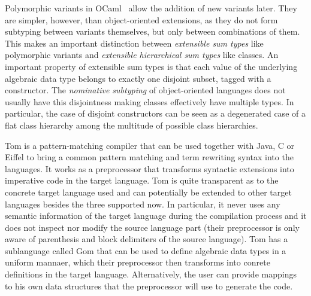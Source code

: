 Polymorphic variants in OCaml~\cite{garrigue-98} allow the addition of new variants 
later. They are simpler, however, than object-oriented extensions, as they do not 
form subtyping between variants themselves, but only between combinations of them. 
This makes an important distinction between \emph{extensible sum types} like 
polymorphic variants and \emph{extensible hierarchical sum types} like classes.
An important property of extensible sum types is that each value of the 
underlying algebraic data type belongs to exactly one disjoint subset, tagged with 
a constructor. The \emph{nominative subtyping} of object-oriented languages does 
not usually have this disjointness making classes effectively have multiple 
types. In particular, the case of disjoint constructors can be seen as a 
degenerated case of a flat class hierarchy among the multitude of possible class 
hierarchies.

Tom is a pattern-matching compiler that can be used together with Java, C or 
Eiffel to bring a common pattern matching and term rewriting syntax into the 
languages\cite{Moreau:2003}. It works as a preprocessor that transforms 
syntactic extensions into imperative code in the target language. Tom is quite 
transparent as to the concrete target language used and can potentially be 
extended to other target languages besides the three supported now. In 
particular, it never uses any semantic information of the target language during 
the compilation process and it does not inspect nor modify the source language 
part (their preprocessor is only aware of parenthesis and block delimiters of 
the source language). Tom has a sublanguage called Gom that can be used to 
define algebraic data types in a uniform mannaer, which their preprocessor then 
transforms into conrete definitions in the target language. Alternatively, the 
user can provide mappings to his own data structures that the preprocessor will 
use to generate the code.

